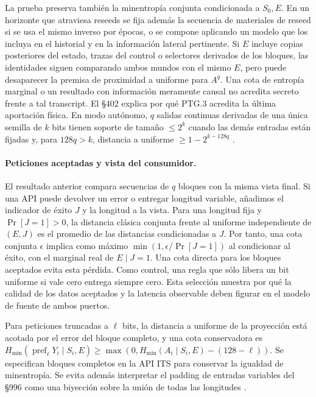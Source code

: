 \documentclass[11pt,a4paper]{article}
\newcommand{\hm}{H_{\min}}
\begin{document}
La prueba preserva también la minentropía conjunta condicionada a $S_0,E$.
En un horizonte que atraviesa reseeds se fija además la secuencia de materiales
de reseed si se usa el mismo inverso por épocas, o se compone aplicando un
modelo que los incluya en el historial y en la información lateral pertinente.
Si $E$ incluye copias posteriores del estado, trazas del control o selectores
derivados de los bloques, las identidades siguen comparando ambos mundos
con el mismo $E$, pero puede desaparecer la premisa de proximidad a uniforme
para $A^q$. Una cota de entropía marginal o un resultado con información
meramente causal no acredita secreto frente a tal transcript. El §402
explica por qué PTG.3 acredita la última aportación física. En modo autónomo,
$q$ salidas continuas derivadas de una única semilla de $k$ bits tienen
soporte de tamaño $\le 2^k$ cuando las demás entradas están fijadas y, para
$128q>k$, distancia a uniforme $\ge 1-2^{k-128q}$
\cite[§§390(iii), 397(ii), 402--403 y 996--998]{ais}.

\paragraph{Peticiones aceptadas y vista del consumidor.}
El resultado anterior compara secuencias de $q$ bloques con la misma vista final.
Si una API puede devolver un error o entregar longitud variable, añadimos el
indicador de éxito $J$ y la longitud a la vista. Para una longitud fija y
$\Pr[J=1]>0$, la distancia clásica conjunta frente al uniforme independiente
de $(E,J)$ es el promedio de las distancias condicionadas a $J$. Por tanto,
una cota conjunta $\epsilon$ implica como máximo
$\min(1,\epsilon/\Pr[J=1])$ al condicionar al éxito, con el marginal real
de $E\mid J=1$. Una cota directa para los bloques aceptados evita esta pérdida.
Como control, una regla que sólo libera un bit uniforme si vale cero entrega
siempre cero. Esta selección muestra por qué la calidad de los datos aceptados
y la latencia observable deben figurar en el modelo de fuente de ambos puertos.

Para peticiones truncadas a $\ell$ bits, la distancia a uniforme de la
proyección está acotada por el error del bloque completo, y una cota
conservadora es $\hm(\operatorname{pref}_\ell Y_i\mid S_i,E)\ge
\max(0,\hm(A_i\mid S_i,E)-(128-\ell))$. Se especifican bloques completos
en la API ITS para conservar la igualdad de minentropía. Se evita además
interpretar el padding de entradas variables del §996 como una biyección
sobre la unión de todas las longitudes \cite[§§976, 996--997]{ais}.
\end{document}
